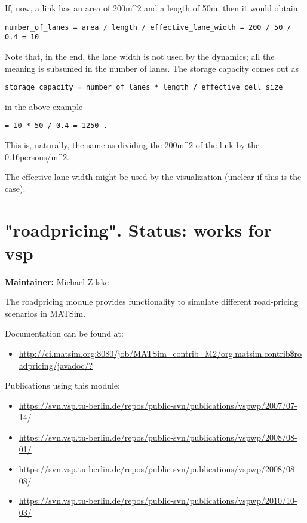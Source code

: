 \documentclass[a4paper,11pt]{report}
\begin{document}
If, now, a link has an area of 200m\textasciicircum2 and a length of 50m, then it would obtain
\begin{verbatim}
number_of_lanes = area / length / effective_lane_width = 200 / 50 / 0.4 = 10

\end{verbatim}

Note that, in the end, the lane width is not used by the  dynamics; all the meaning is subsumed in the number of lanes. The  storage capacity comes out as
\begin{verbatim}
storage_capacity = number_of_lanes * length / effective_cell_size

\end{verbatim}

in the above example
\begin{verbatim}
= 10 * 50 / 0.4 = 1250 .

\end{verbatim}

This is, naturally, the same as dividing the 200m\textasciicircum2 of the link by the 0.16persons/m\textasciicircum2.

The effective lane width might be used by the visualization (unclear if this is the case).

\vfill\eject
\section{"roadpricing".  Status: works for vsp}

\textbf{Maintainer:} Michael Zilske

The roadpricing module provides functionality to simulate different road-pricing scenarios in MATSim.

Documentation can be found at:
\begin{itemize}
	\item \href{http://ci.matsim.org:8080/job/MATSim_contrib_M2/org.matsim.contrib$roadpricing/javadoc/?}{http://ci.matsim.org:8080/job/MATSim\_contrib\_M2/org.matsim.contrib\$roadpricing/javadoc/?}
\end{itemize}

Publications using this module:
\begin{itemize}
	\item \href{https://svn.vsp.tu-berlin.de/repos/public-svn/publications/vspwp/2007/07-14/}{https://svn.vsp.tu-berlin.de/repos/public-svn/publications/vspwp/2007/07-14/}
	\item \href{https://svn.vsp.tu-berlin.de/repos/public-svn/publications/vspwp/2008/08-01/}{https://svn.vsp.tu-berlin.de/repos/public-svn/publications/vspwp/2008/08-01/}
	\item \href{https://svn.vsp.tu-berlin.de/repos/public-svn/publications/vspwp/2008/08-08/}{https://svn.vsp.tu-berlin.de/repos/public-svn/publications/vspwp/2008/08-08/}
	\item \href{https://svn.vsp.tu-berlin.de/repos/public-svn/publications/vspwp/2010/10-03/}{https://svn.vsp.tu-berlin.de/repos/public-svn/publications/vspwp/2010/10-03/}
\end{itemize}
\end{document}
